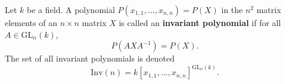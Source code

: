Let $k$ be a field. A polynomial $P(x_{1,1}, \ldots, x_{n,n}) = P(X)$ in the $n^2$ matrix elements of an $n \times n$ matrix $X$ is called an \textbf{invariant polynomial} if for all $A \in \text{GL}_n(k)$,
$$
P(A X A^{-1}) = P(X).
$$
The set of all invariant polynomials is denoted
$$
\text{Inv}(n) = k[x_{1,1}, \ldots, x_{n,n}]^{\text{GL}_n(k)}.
$$
